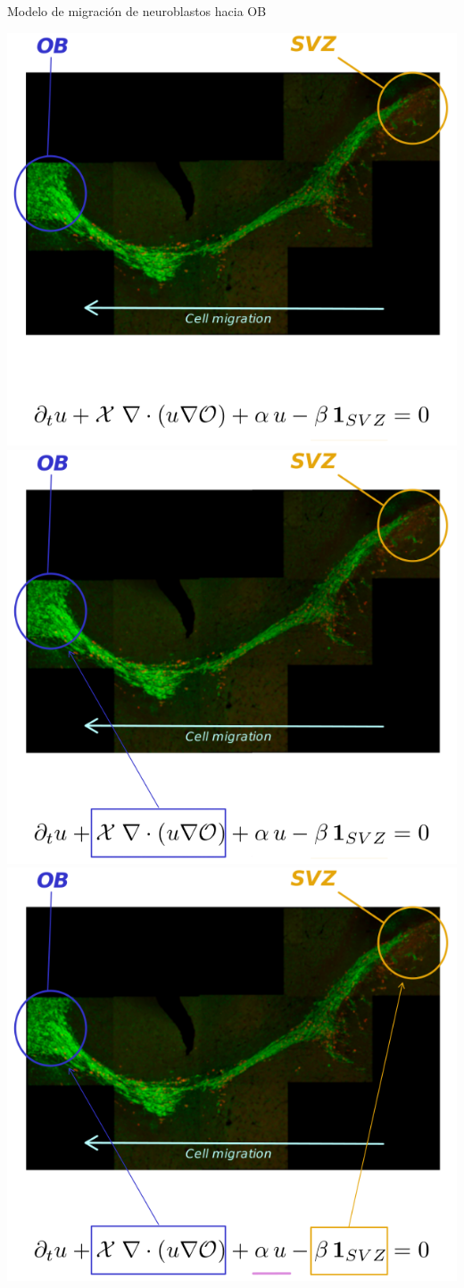 \documentclass[
  unknownkeysallowed %
]{beamer}
\begin{document}
\begin{frame}{Modelo de migración de neuroblastos hacia OB}
  \vspace{-0.8em}
  \begin{overprint}
    \centering\includegraphics[width=0.64\linewidth]{img/ecuacion_nb_OB-0.png}
    \centering\includegraphics[width=0.64\linewidth]{img/ecuacion_nb_OB-1.png}
    \centering\includegraphics[width=0.64\linewidth]{img/ecuacion_nb_OB-2.png}

\end{overprint}
\end{frame}
\end{document}
